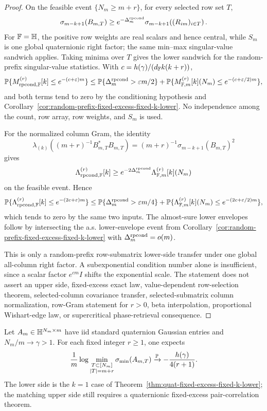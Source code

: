 \begin{proof}
On the feasible event \(\{N_m\ge m+r\}\), for every selected row set \(T\),
\[
  \sigma_{m-k+1}(B_{m,T})
  \ge
  e^{-\Delta_m^{\rm rpcond}}
  \sigma_{m-k+1}\!\left((R_{im})_{i\in T}\right).
\]
For \(\mathbb{F}=\mathbb{H}\), the positive row weights are real scalars and hence central,
while \(S_m\) is one global quaternionic right factor; the same min--max
singular-value sandwich applies.  Taking minima over \(T\) gives the lower
sandwich for the random-prefix singular-value statistics.  With
\(c=h(\gamma)/(d_{\mathbb{F}} k(k+r))\),
\[
  \mathbb{P}\{M_{\rm rpcond,\mathbb{F}}^{(r)}[k]\le e^{-(c+\varepsilon)m}\}
  \le
  \mathbb{P}\{\Delta_m^{\rm rpcond}>\varepsilon m/2\}
  +\mathbb{P}\{M_{\mathbb{F},m}^{(r)}[k](N_m)\le e^{-(c+\varepsilon/2)m}\},
\]
and both terms tend to zero by the conditioning hypothesis and
Corollary~\ref{cor:random-prefix-fixed-excess-fixed-k-lower}.  No independence
among the count, row array, row weights, and \(S_m\) is used.

For the normalized column Gram, the identity
\[
  \lambda_{(k)}\!\left((m+r)^{-1}B_{m,T}^*B_{m,T}\right)
  =(m+r)^{-1}\sigma_{m-k+1}(B_{m,T})^2
\]
gives
\[
  \Lambda_{\rm rpcond,\mathbb{F}}^{(r)}[k]\ge
  e^{-2\Delta_m^{\rm rpcond}}\Lambda_{\mathbb{F},m}^{(r)}[k](N_m)
\]
on the feasible event.  Hence
\[
  \mathbb{P}\{\Lambda_{\rm rpcond,\mathbb{F}}^{(r)}[k]\le e^{-(2c+\varepsilon)m}\}
  \le
  \mathbb{P}\{\Delta_m^{\rm rpcond}>\varepsilon m/4\}
  +\mathbb{P}\{\Lambda_{\mathbb{F},m}^{(r)}[k](N_m)\le e^{-(2c+\varepsilon/2)m}\},
\]
which tends to zero by the same two inputs.  The almost-sure lower envelopes
follow by intersecting the a.s. lower-envelope event from
Corollary~\ref{cor:random-prefix-fixed-excess-fixed-k-lower} with
\(\Delta_m^{\rm rpcond}=o(m)\).

This is only a random-prefix row-submatrix lower-side transfer under one global
all-column right factor.  A subexponential condition number alone is
insufficient, since a scalar factor \(e^{cm}I\) shifts the exponential scale.
The statement does not assert an upper side, fixed-excess exact law,
value-dependent row-selection theorem, selected-column covariance transfer,
selected-submatrix column normalization, row-Gram statement for \(r>0\), beta
interpolation, proportional Wishart-edge law, or supercritical phase-retrieval
consequence.
\end{proof}

\begin{conjecture}\label{conj:quat-fixed-excess}
Let \(A_m\in\mathbb{H}^{N_m\times m}\) have iid standard quaternion Gaussian entries
and \(N_m/m\to\gamma>1\).  For each fixed integer \(r\ge1\), one expects
\[
  \frac{1}{m}\log\min_{\substack{T\subset[N_m]\\ |T|=m+r}}\sigma_{\min}(A_{m,T})
  \xrightarrow{\mathbb{P}}-\frac{h(\gamma)}{4(r+1)}.
\]
The lower side is the \(k=1\) case of
Theorem~\ref{thm:quat-fixed-excess-fixed-k-lower}; the matching upper side still
requires a quaternionic fixed-excess pair-correlation theorem.
\end{conjecture}


